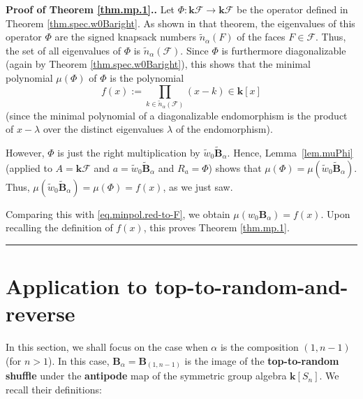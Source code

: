 \documentclass[12pt]{article}
\theoremstyle{definition}%
\theoremstyle{definition}%
\theoremstyle{remark}%
\newcommand{\tup}[1]{\left( #1 \right)}
\newcommand{\sbr}[1]{\left[ #1 \right]} %
\newcommand{\kk}{\mathbf{k}}
\newcommand{\ksn}{\kk\left[S_n\right]}
\newcommand{\kf}{\kk\mathcal{F}}
\newcommand{\BB}{\mathbf{B}}
\newcommand{\BBa}{\mathbf{B}_{\alpha}}
\newcommand{\BBta}{\widetilde{\mathbf{B}}_{\alpha}}
\newcommand{\CF}{\mathcal{F}}
\newcommand{\wo}{w_0} %
\newcommand{\wotil}{\widetilde{w}_0}
\newcommand{\nna}{\widetilde{n}_{ \alpha } }%
\newcommand{\defin}[1]{\textbf{#1}}
\newenvironment{proof}[1][Proof]{\noindent\textbf{#1.} }{\ \rule{0.5em}{0.5em}}
\begin{document}
\begin{proof}[Proof of Theorem \ref{thm.mp.1}.]
Let $\Phi:\kf\to\kf$ be the operator defined in Theorem
\ref{thm.spec.w0Baright}.
As shown in that theorem, the eigenvalues of this
operator $\Phi$ are the signed knapsack numbers
$\nna\tup{F}$ of the faces $F \in \CF$.
Thus, the set of all eigenvalues of $\Phi$ is
$\nna\tup{\CF}$.
Since $\Phi$ is furthermore diagonalizable
(again by Theorem \ref{thm.spec.w0Baright}), this shows that the
minimal polynomial $\mu\tup{\Phi}$ of $\Phi$ is the polynomial
\[
f\tup{x}  :=\prod_{k \in \nna\tup{\CF}}\tup{x-k}
\in\kk\sbr{x}
\]
(since the minimal polynomial of a diagonalizable
endomorphism is the product of $x-\lambda$ over the
distinct eigenvalues $\lambda$ of the endomorphism).

However, $\Phi$ is just the right multiplication by
$\wotil\BBta$. Hence, Lemma~\ref{lem.muPhi}
(applied to $A = \kf$ and $a = \wotil\BBta$ and $R_a = \Phi$)
shows that
$\mu\tup{\Phi} = \mu\tup{\wotil\BBta}$.
Thus,
$\mu\tup{\wotil\BBta} = \mu\tup{\Phi} = f\tup{x}$,
as we just saw.

Comparing this with \eqref{eq.minpol.red-to-F}, we obtain
$\mu\tup{\wo\BBa} = f\tup{x}$.
Upon recalling the definition of $f\tup{x}$,
this proves Theorem \ref{thm.mp.1}.
\end{proof}


\section{\label{sec.ttr}Application to top-to-random-and-reverse}

In this section, we shall focus on the case when $\alpha$ is the composition $\tup{1,n-1}$
(for $n > 1$).
In this case, $\BBa = \BB_{\tup{1, n-1}}$ is the image of the \defin{top-to-random shuffle} under the \defin{antipode} map of the symmetric group algebra $\ksn$.
We recall their definitions:
\end{document}
